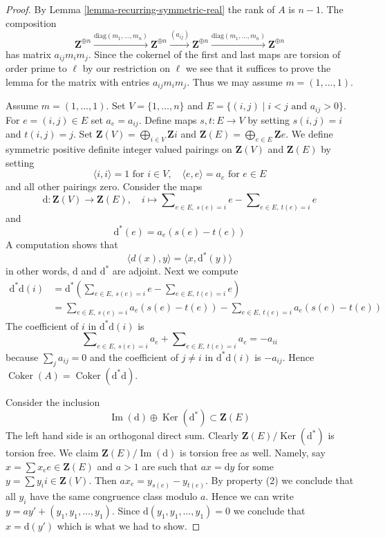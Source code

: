 \documentclass[10pt,a4paper]{amsart}
\theoremstyle{plain}
\theoremstyle{definition}
\theoremstyle{remark}
\numberwithin{equation}{subsection}
\def\Ker{\mathop{\mathrm{Ker}}}
\def\Im{\mathop{\mathrm{Im}}}
\def\Coker{\mathop{\mathrm{Coker}}}
\begin{document}
\begin{proof}
By Lemma \ref{lemma-recurring-symmetric-real} the rank of $A$ is $n - 1$.
The composition
$$
\mathbf{Z}^{\oplus n} \xrightarrow{\text{diag}(m_1, \ldots, m_n)}
\mathbf{Z}^{\oplus n} \xrightarrow{(a_{ij})}
\mathbf{Z}^{\oplus n} \xrightarrow{\text{diag}(m_1, \ldots, m_n)}
\mathbf{Z}^{\oplus n}
$$
has matrix $a_{ij}m_im_j$. Since the cokernel of the first and last
maps are torsion of order prime to $\ell$ by our restriction on $\ell$
we see that it suffices to prove the lemma for the matrix
with entries $a_{ij}m_im_j$. Thus we may assume $m = (1, \ldots, 1)$.

\medskip\noindent
Assume $m = (1, \ldots, 1)$. Set $V = \{1, \ldots, n\}$ and
$E = \{(i, j) \mid i < j\text{ and }a_{ij} > 0\}$. For
$e = (i, j) \in E$ set $a_e = a_{ij}$. Define maps
$s, t : E \to V$ by setting $s(i, j) = i$ and $t(i, j) = j$.
Set
$\mathbf{Z}(V) = \bigoplus_{i \in V} \mathbf{Z}i$ and
$\mathbf{Z}(E) = \bigoplus_{e \in E} \mathbf{Z}e$.
We define symmetric positive definite integer valued pairings
on $\mathbf{Z}(V)$ and $\mathbf{Z}(E)$ by setting
$$
\langle i, i \rangle = 1\text{ for }i \in V, \quad
\langle e, e \rangle = a_e\text{ for }e \in E
$$
and all other pairings zero. Consider the maps
$$
\text{d} : \mathbf{Z}(V) \to \mathbf{Z}(E), \quad
i \longmapsto
\sum\nolimits_{e \in E,\ s(e) = i} e - \sum\nolimits_{e \in E,\ t(e) = i} e
$$
and
$$
\text{d}^*(e) = a_e(s(e) - t(e))
$$
A computation shows that
$$
\langle d(x), y\rangle = \langle x, \text{d}^*(y) \rangle
$$
in other words, $\text{d}$ and $\text{d}^*$ are adjoint. Next we compute
\begin{align*}
\text{d}^*\text{d}(i)
& = 
\text{d}^*(
\sum\nolimits_{e \in E,\ s(e) = i} e - \sum\nolimits_{e \in E,\ t(e) = i} e) \\
& =
\sum\nolimits_{e \in E,\ s(e) = i} a_e(s(e) - t(e)) -
\sum\nolimits_{e \in E,\ t(e) = i} a_e(s(e) - t(e))
\end{align*}
The coefficient of $i$ in $\text{d}^*\text{d}(i)$ is
$$
\sum\nolimits_{e \in E,\ s(e) = i} a_e +
\sum\nolimits_{e \in E,\ t(e) = i} a_e = - a_{ii}
$$
because $\sum_j a_{ij} = 0$ and the coefficient of
$j \not = i$ in $\text{d}^*\text{d}(i)$ is $-a_{ij}$.
Hence $\Coker(A) = \Coker(\text{d}^*\text{d})$.

\medskip\noindent
Consider the inclusion
$$
\Im(\text{d}) \oplus \Ker(\text{d}^*) \subset \mathbf{Z}(E)
$$
The left hand side is an orthogonal direct sum. Clearly
$\mathbf{Z}(E)/\Ker(\text{d}^*)$ is torsion free.
We claim $\mathbf{Z}(E)/\Im(\text{d})$ is torsion free as well.
Namely, say $x = \sum x_e e \in \mathbf{Z}(E)$ and $a > 1$ are such
that $ax = \text{d}y$ for some $y = \sum y_i i \in \mathbf{Z}(V)$.
Then $a x_e = y_{s(e)} - y_{t(e)}$. By property (2) we conclude
that all $y_i$ have the same congruence class modulo $a$.
Hence we can write $y = a y' + (y_1, y_1, \ldots, y_1)$.
Since $\text{d}(y_1, y_1, \ldots, y_1) = 0$ we conclude
that $x = \text{d}(y')$ which is what we had to show.


\end{proof}
\end{document}
